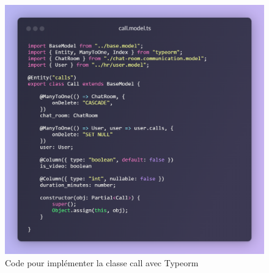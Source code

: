 \begin{figure}[H]
    \centering
    \includegraphics[width=16cm]{assets/annexes/snippet (2).png}
    \caption{Code pour implémenter la classe call avec Typeorm}
\end{figure}


